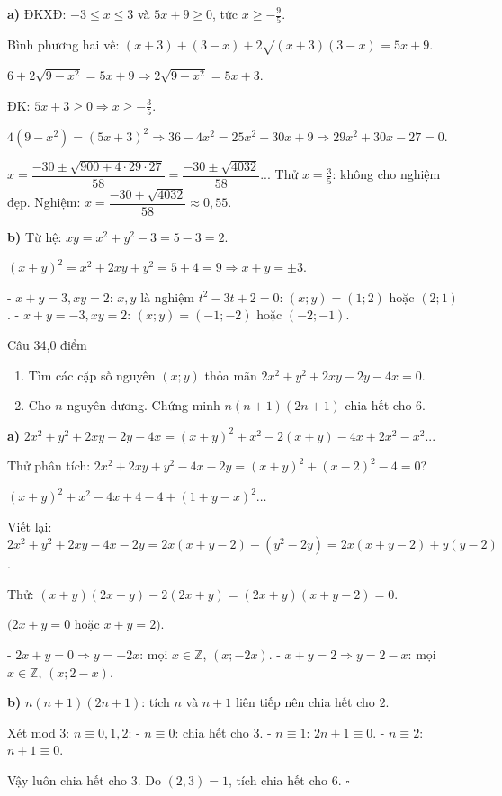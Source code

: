 \begin{loi_giai_cau}
\textbf{a)} ĐKXĐ: $-3\leq x\leq 3$ và $5x+9\geq 0$, tức $x\geq -\frac{9}{5}$.

Bình phương hai vế: $(x+3)+(3-x)+2\sqrt{(x+3)(3-x)}=5x+9$.

$6+2\sqrt{9-x^2}=5x+9\Rightarrow 2\sqrt{9-x^2}=5x+3$.

ĐK: $5x+3\geq 0\Rightarrow x\geq -\frac{3}{5}$.

$4(9-x^2)=(5x+3)^2\Rightarrow 36-4x^2=25x^2+30x+9\Rightarrow 29x^2+30x-27=0$.

$x=\dfrac{-30\pm\sqrt{900+4\cdot29\cdot27}}{58}=\dfrac{-30\pm\sqrt{4032}}{58}$...
Thử $x=\frac{3}{5}$: không cho nghiệm đẹp. Nghiệm: $x=\dfrac{-30+\sqrt{4032}}{58}\approx 0{,}55$.

\textbf{b)} Từ hệ: $xy = x^2+y^2-3=5-3=2$.

$(x+y)^2=x^2+2xy+y^2=5+4=9\Rightarrow x+y=\pm 3$.

- $x+y=3, xy=2$: $x,y$ là nghiệm $t^2-3t+2=0$: $(x;y)=(1;2)$ hoặc $(2;1)$.
- $x+y=-3, xy=2$: $(x;y)=(-1;-2)$ hoặc $(-2;-1)$.
\end{loi_giai_cau}

\begin{de_cau}{Câu 3}{4,0 điểm}
\begin{enumerate}[label=\alph*)]
\item Tìm các cặp số nguyên $(x;y)$ thỏa mãn $2x^2+y^2+2xy-2y-4x=0$.
\item Cho $n$ nguyên dương. Chứng minh $n(n+1)(2n+1)$ chia hết cho $6$.
\end{enumerate}
\end{de_cau}

\begin{loi_giai_cau}
\textbf{a)} $2x^2+y^2+2xy-2y-4x=(x+y)^2+x^2-2(x+y)-4x+2x^2-x^2$...

Thử phân tích: $2x^2+2xy+y^2-4x-2y=(x+y)^2+(x-2)^2-4=0$?

$(x+y)^2+x^2-4x+4-4+(1+y-x)^2\ldots$

Viết lại: $2x^2+y^2+2xy-4x-2y=2x(x+y-2)+(y^2-2y)=2x(x+y-2)+y(y-2)$.

Thử: $(x+y)(2x+y)-2(2x+y)=(2x+y)(x+y-2)=0$.

$(2x+y=0$ hoặc $x+y=2)$.

- $2x+y=0\Rightarrow y=-2x$: mọi $x\in\mathbb{Z}$, $(x;-2x)$.
- $x+y=2\Rightarrow y=2-x$: mọi $x\in\mathbb{Z}$, $(x;2-x)$.

\textbf{b)} $n(n+1)(2n+1)$: tích $n$ và $n+1$ liên tiếp nên chia hết cho $2$.

Xét mod $3$: $n\equiv 0,1,2$:
- $n\equiv 0$: chia hết cho $3$.
- $n\equiv 1$: $2n+1\equiv 0$.
- $n\equiv 2$: $n+1\equiv 0$.

Vậy luôn chia hết cho $3$. Do $(2,3)=1$, tích chia hết cho $6$. $\square$
\end{loi_giai_cau}

